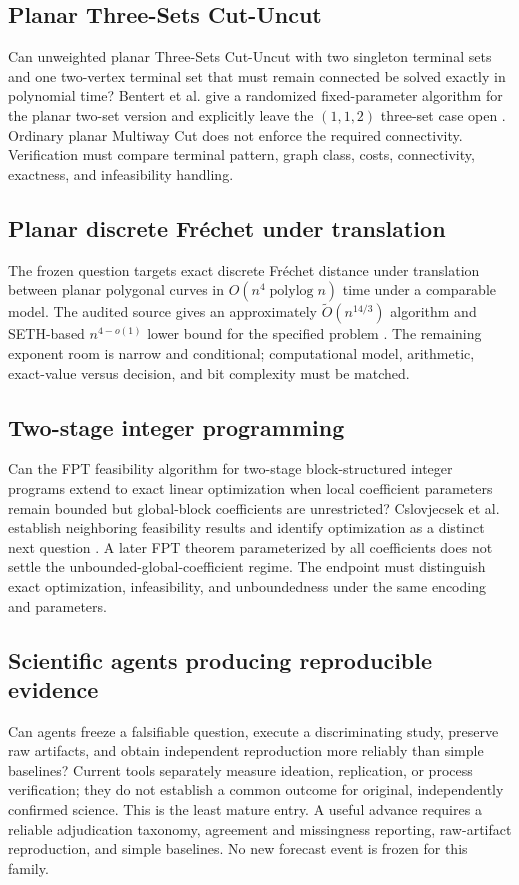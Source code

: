 \documentclass[11pt]{article}
\begin{document}
\subsection{Planar Three-Sets Cut-Uncut}
Can unweighted planar Three-Sets Cut-Uncut with two singleton terminal sets and one two-vertex terminal set that must remain connected be solved exactly in polynomial time? Bentert et al. give a randomized fixed-parameter algorithm for the planar two-set version and explicitly leave the $(1,1,2)$ three-set case open \citep{bentert2024twosets}. Ordinary planar Multiway Cut does not enforce the required connectivity. Verification must compare terminal pattern, graph class, costs, connectivity, exactness, and infeasibility handling.

\subsection{Planar discrete Fr\'echet under translation}
The frozen question targets exact discrete Fr\'echet distance under translation between planar polygonal curves in $O(n^4\operatorname{polylog}n)$ time under a comparable model. The audited source gives an approximately $\widetilde O(n^{14/3})$ algorithm and SETH-based $n^{4-o(1)}$ lower bound for the specified problem \citep{bringmann2019frechet}. The remaining exponent room is narrow and conditional; computational model, arithmetic, exact-value versus decision, and bit complexity must be matched.

\subsection{Two-stage integer programming}
Can the FPT feasibility algorithm for two-stage block-structured integer programs extend to exact linear optimization when local coefficient parameters remain bounded but global-block coefficients are unrestricted? Cslovjecsek et al. establish neighboring feasibility results and identify optimization as a distinct next question \citep{cslovjecsek2025blockip}. A later FPT theorem parameterized by all coefficients does not settle the unbounded-global-coefficient regime. The endpoint must distinguish exact optimization, infeasibility, and unboundedness under the same encoding and parameters.

\subsection{Scientific agents producing reproducible evidence}
Can agents freeze a falsifiable question, execute a discriminating study, preserve raw artifacts, and obtain independent reproduction more reliably than simple baselines? Current tools separately measure ideation, replication, or process verification; they do not establish a common outcome for original, independently confirmed science. This is the least mature entry. A useful advance requires a reliable adjudication taxonomy, agreement and missingness reporting, raw-artifact reproduction, and simple baselines. No new forecast event is frozen for this family.
\end{document}
